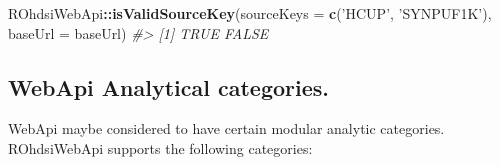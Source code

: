 \documentclass[
]{article}
\newenvironment{Shaded}{\begin{snugshade}}{\end{snugshade}}
\newcommand{\CommentTok}[1]{\textcolor[rgb]{0.56,0.35,0.01}{\textit{#1}}}
\newcommand{\DataTypeTok}[1]{\textcolor[rgb]{0.13,0.29,0.53}{#1}}
\newcommand{\KeywordTok}[1]{\textcolor[rgb]{0.13,0.29,0.53}{\textbf{#1}}}
\newcommand{\NormalTok}[1]{#1}
\newcommand{\OperatorTok}[1]{\textcolor[rgb]{0.81,0.36,0.00}{\textbf{#1}}}
\newcommand{\StringTok}[1]{\textcolor[rgb]{0.31,0.60,0.02}{#1}}
\begin{document}
\begin{Shaded}
\begin{Highlighting}[]

\NormalTok{ROhdsiWebApi}\OperatorTok{::}\KeywordTok{isValidSourceKey}\NormalTok{(}\DataTypeTok{sourceKeys =} \KeywordTok{c}\NormalTok{(}\StringTok{'HCUP'}\NormalTok{, }\StringTok{'SYNPUF1K'}\NormalTok{), }\DataTypeTok{baseUrl =}\NormalTok{ baseUrl)}
\CommentTok{#> [1]  TRUE FALSE}
\end{Highlighting}
\end{Shaded}

\hypertarget{webapi-analytical-categories.}{%
\subsection{WebApi Analytical
categories.}\label{webapi-analytical-categories.}}

WebApi maybe considered to have certain modular analytic categories.
ROhdsiWebApi supports the following categories:
\end{document}
